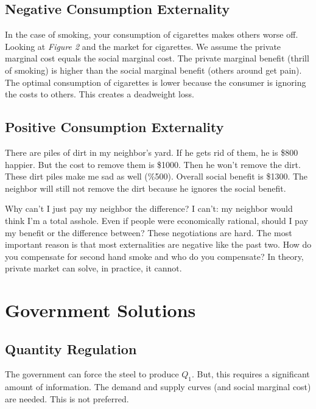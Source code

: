 \documentclass{article}
\begin{document}
\subsection{ Negative Consumption Externality }

In the case of smoking, your consumption of cigarettes makes others worse off.
Looking at \textit{Figure 2} and the market for cigarettes. We assume the
private marginal cost equals the social marginal cost. The private marginal
benefit (thrill of smoking) is higher than the social marginal benefit (others
around get pain). The optimal consumption of cigarettes is lower because the
consumer is ignoring the costs to others. This creates a deadweight loss.

\subsection{ Positive Consumption Externality }

There are piles of dirt in my neighbor's yard. If he gets rid of them, he is
\$800 happier. But the cost to remove them is \$1000. Then he won't remove the
dirt. These dirt piles make me sad as well (\%500). Overall social benefit is
\$1300. The neighbor will still not remove the dirt because he ignores the
social benefit. 

\bigbreak

Why can't I just pay my neighbor the difference? I can't: my neighbor would
think I'm a total asshole. Even if people were economically rational, should I
pay my benefit or the difference between? These negotiations are hard. The most
important reason is that most externalities are negative like the past two. How
do you compensate for second hand smoke and who do you compensate? In theory,
private market can solve, in practice, it cannot.

\section{ Government Solutions }

\subsection{ Quantity Regulation }

The government can force the steel to produce $Q_{1}$. But, this requires a
significant amount of information. The demand and supply curves (and social
marginal cost) are needed. This is not preferred.
\end{document}

